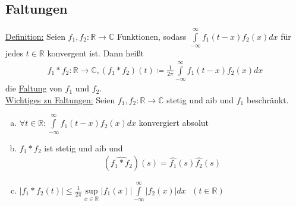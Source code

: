 \documentclass{article}
\begin{document}
\subsection{Faltungen}
\underline{Definition:} Seien $f_1,f_2: \mathbb{R} \to \mathbb{C}$ Funktionen, sodass $\int \limits_{-\infty}^\infty f_1(t-x)f_2(x)dx$ für jedes $t \in \mathbb{R}$ konvergent ist. Dann heißt
\begin{align*}
    f_1 * f_2: \mathbb{R} \to \mathbb{C}, (f_1*f_2)(t) \coloneqq \frac{1}{2\pi} \int \limits_{-\infty}^\infty f_1(t-x)f_2(x)dx
\end{align*}
die \underline{Faltung} von $f_1$ und $f_2$. \\
\underline{Wichtiges zu Faltungen:} Seien $f_1,f_2: \mathbb{R} \to \mathbb{C}$ stetig und aib und $f_1$ beschränkt.
\begin{enumerate} [a)]
    \item $\forall t \in \mathbb{R}: \int \limits_{-\infty}^\infty f_1(t-x)f_2(x)dx$ konvergiert absolut
    \item $f_1*f_2$ ist stetig und aib und
    \begin{align*}
        (\widehat{f_1*f_2})(s) = \widehat{f_1}(s) \widehat{f_2}(s)
    \end{align*}
    \item $\lvert f_1*f_2(t)\rvert \leq \frac{1}{2\pi} \sup \limits_{x \in \mathbb{R}} \lvert f_1(x)\rvert \int \limits_{-\infty}^\infty \lvert f_2(x)\rvert dx \text{ } (t \in \mathbb{R})$
\end{enumerate}
\end{document}
